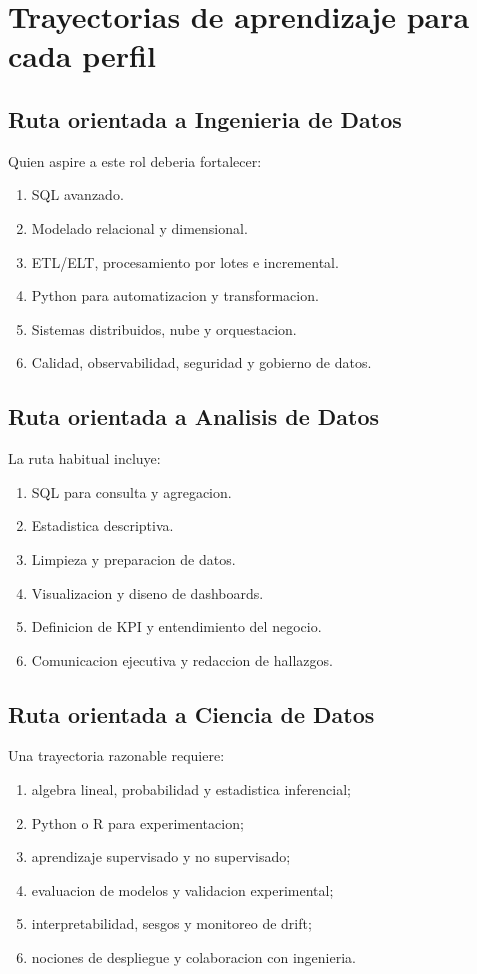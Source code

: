 \documentclass[12pt]{article}
\begin{document}
\section{Trayectorias de aprendizaje para cada perfil}
\subsection{Ruta orientada a Ingenieria de Datos}
Quien aspire a este rol deberia fortalecer:
\begin{enumerate}[label=\textbf{R\arabic*.}, leftmargin=*]
\item SQL avanzado.
\item Modelado relacional y dimensional.
\item ETL/ELT, procesamiento por lotes e incremental.
\item Python para automatizacion y transformacion.
\item Sistemas distribuidos, nube y orquestacion.
\item Calidad, observabilidad, seguridad y gobierno de datos.
\end{enumerate}

\subsection{Ruta orientada a Analisis de Datos}
La ruta habitual incluye:
\begin{enumerate}[label=\textbf{R\arabic*.}, leftmargin=*]
\item SQL para consulta y agregacion.
\item Estadistica descriptiva.
\item Limpieza y preparacion de datos.
\item Visualizacion y diseno de dashboards.
\item Definicion de KPI y entendimiento del negocio.
\item Comunicacion ejecutiva y redaccion de hallazgos.
\end{enumerate}

\subsection{Ruta orientada a Ciencia de Datos}
Una trayectoria razonable requiere:
\begin{enumerate}[label=\textbf{R\arabic*.}, leftmargin=*]
\item algebra lineal, probabilidad y estadistica inferencial;
\item Python o R para experimentacion;
\item aprendizaje supervisado y no supervisado;
\item evaluacion de modelos y validacion experimental;
\item interpretabilidad, sesgos y monitoreo de drift;
\item nociones de despliegue y colaboracion con ingenieria.
\end{enumerate}
\end{document}
